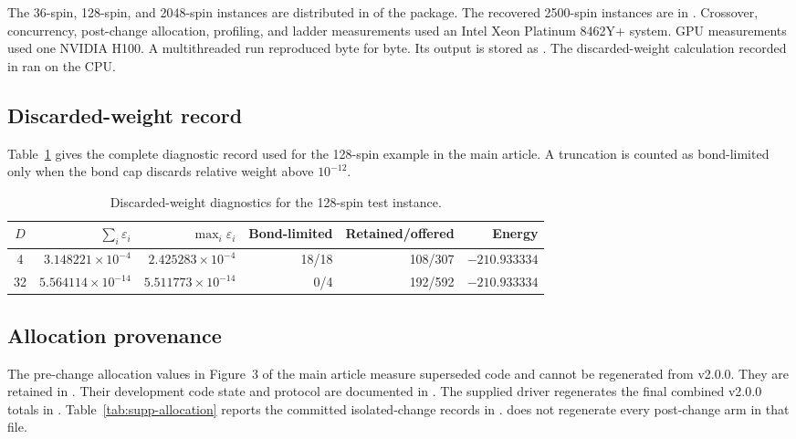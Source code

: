 \documentclass[preprint,12pt,a4paper]{elsarticle}
\begin{document}
The 36-spin, 128-spin, and 2048-spin instances are distributed in
 of the package. The recovered 2500-spin instances
are in . Crossover, concurrency,
post-change allocation, profiling, and ladder measurements used an Intel Xeon
Platinum 8462Y+ system. GPU measurements used one NVIDIA H100.
A multithreaded run reproduced  byte for byte. Its output
is stored as . The discarded-weight calculation
recorded in  ran on the CPU.

\subsection{Discarded-weight record}

Table~\ref{tab:supp-eps} gives the complete diagnostic record used for the
128-spin example in the main article. A truncation is counted as bond-limited
only when the bond cap discards relative weight above $10^{-12}$.

\begin{table}[htbp]
\scriptsize
\centering
\caption{Discarded-weight diagnostics for the 128-spin test instance.}
\label{tab:supp-eps}
\begin{tabular}{@{}crrrrr@{}}
\toprule
$D$ & $\sum_i\varepsilon_i$ & $\max_i\varepsilon_i$ &
Bond-limited & Retained/offered & Energy \\
\midrule
4  & $3.148221\times10^{-4}$ & $2.425283\times10^{-4}$ &
18/18 & 108/307 & $-210.933334$ \\
32 & $5.564114\times10^{-14}$ & $5.511773\times10^{-14}$ &
0/4 & 192/592 & $-210.933334$ \\
\bottomrule
\end{tabular}
\end{table}

\subsection{Allocation provenance}

The pre-change allocation values in Figure~3 of the main article measure
superseded code and cannot be regenerated from v2.0.0. They are retained in
. Their development code state and protocol are documented
in . The supplied driver regenerates the final combined
v2.0.0 totals in .
Table~\ref{tab:supp-allocation} reports the committed isolated-change records in
.  does not regenerate every
post-change arm in that file.
\end{document}
